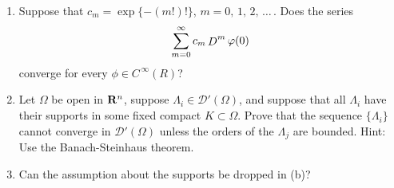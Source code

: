 %
%
{\it
\begin{enumerate}[item-label=(\alph{enumi})]
\item Suppose that $c_m=\exp\{\minus (m!)!\}$, $m=0,\, 1,\, 2,\, \dots\, $. Does the series
%
\begin{align*}{
  \sum_{m=0}^\infty c_m \deriv[m]{\phi}(0)
}\end{align*}
%
converge for every $\phi\in C^{\,\infty} (R)$?
\item Let $\Omega$ be open in $\mathbf{R}^n$, suppose $\Lambda_i\in \mathcal{D}'(\Omega)$, and suppose that all $\Lambda_i$ have %
their supports in some fixed compact $K\subset \Omega$. Prove that the sequence $\{\Lambda_i\}$ cannot converge in %
$\mathcal{D}'(\Omega)$ unless the orders of the $\Lambda_j$ are bounded. Hint: Use the Banach-Steinhaus theorem.
\item Can the assumption about the supports be dropped in (b)?
\end{enumerate}}
%
